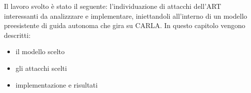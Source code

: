 Il lavoro svolto è stato il seguente:  l'individuazione di attacchi dell'ART interessanti da analizzzare e implementare, iniettandoli all'interno di un modello preesistente di guida
autonoma che gira su CARLA. In questo capitolo vengono descritti:\begin{itemize}
    \item il modello scelto
    \item gli attacchi scelti
    \item implementazione e risultati
\end{itemize}




